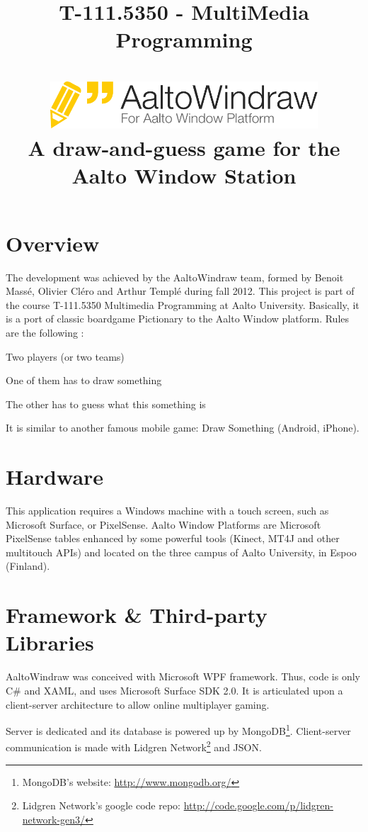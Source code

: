 \documentclass[a4paper,12pt]{article}
\title{  {\large T-111.5350 - MultiMedia Programming}\\~\\
		\includegraphics[width=0.75\textwidth]{images/logo-with-text.pdf}\\
		A draw-and-guess game for the Aalto Window Station
	}
\newenvironment{my_itemize}{
\begin{itemize}
	\setlength{\topsep}{0pt}
	\setlength{\itemsep}{3pt}
	\setlength{\parskip}{0pt}
	\setlength{\parsep}{0pt}}
{\end{itemize}
}
\begin{document}
\maketitle\thispagestyle{fancy}


\section*{Overview}

The development was achieved by the AaltoWindraw team, formed by Benoit Mass\'{e}, Olivier Cl\'{e}ro and Arthur Templ\'{e} during fall 2012. This project is part of the course T-111.5350 Multimedia Programming at Aalto University. Basically, it is a port of classic boardgame Pictionary to the Aalto Window platform. Rules are the following :
\begin{my_itemize}
\item Two players (or two teams)
\item One of them has to draw something
\item The other has to guess what this something is
\end{my_itemize}
It is similar to another famous mobile game: Draw Something (Android, iPhone).

\section*{Hardware}
This application requires a Windows machine with a touch screen, such as Microsoft Surface, or PixelSense. Aalto Window Platforms are Microsoft PixelSense tables enhanced by some powerful tools (Kinect, MT4J and other multitouch APIs) and located on the three campus of Aalto University, in Espoo (Finland).

\section*{Framework \& Third-party Libraries}
AaltoWindraw was conceived with Microsoft WPF framework. Thus, code is only C\# and XAML, and uses Microsoft Surface SDK 2.0. It is articulated upon a client-server architecture to allow online multiplayer gaming.

Server is dedicated and its database is powered up by MongoDB\footnote{MongoDB's website: \href{http://www.mongodb.org/}{http://www.mongodb.org/}}. Client-server communication is made with Lidgren Network\footnote{Lidgren Network's google code repo: \href{http://code.google.com/p/lidgren-network-gen3/}{http://code.google.com/p/lidgren-network-gen3/}} and JSON.
\end{document}
